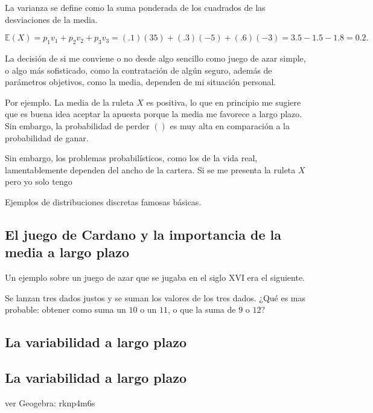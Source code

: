 La varianza se define como la suma ponderada de los cuadrados de las desviaciones de la media.

$$\mathbb E (X)=p_1v_1+p_2v_2+p_3v_3=(.1)(35)+(.3)(-5)+(.6)(-3)=3.5-1.5-1.8=0.2.$$

La decisión de si me conviene o no desde algo sencillo como juego de azar simple, o algo más sofisticado, como la contratación de algún seguro, además de parámetros objetivos, como la media, dependen de mi situación personal.

Por ejemplo. La media de la ruleta $X$ es positiva, lo que en principio me sugiere que es buena idea aceptar la apuesta porque la media me favorece a largo plazo. Sin embargo, la probabilidad de perder $()$ es muy alta en comparación a la probabilidad de ganar.  

Sin embargo, los problemas probabilísticos, como los de la vida real, lamentablemente dependen del ancho de la cartera. Si se me presenta la ruleta $X$ pero yo solo tengo 

Ejemplos de distribuciones discretas famosas básicas.



\subsection{El juego de Cardano y la importancia de la media a largo plazo}

Un ejemplo sobre un juego de azar que se jugaba en el siglo XVI era el siguiente.

\begin{ejercicio}
Se lanzan tres dados justos y se suman los valores de los tres dados. ¿Qué es mas probable: obtener como suma un $10$ o un $11$, o que la suma de $9$ o $12$?
\end{ejercicio}

\subsection{La variabilidad a largo plazo}


\subsection{La variabilidad a largo plazo}


ver Geogebra: rknp4m6s

